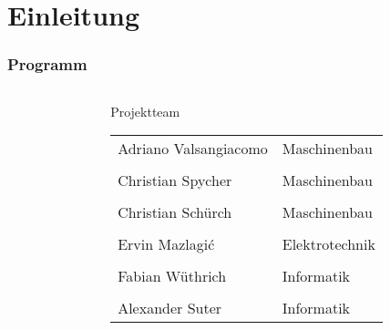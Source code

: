 \section{Einleitung}

\author{Ervin Mazlagi\'c}

\begin{frame}
	\frametitle{Programm\hfill{}\footnotesize \group}
	\begin{columns}
		\begin{column}{0.4\textwidth}
			\tableofcontents[hideallsubsections]
		\end{column}
		\begin{column}{0.6\textwidth}
			\begin{block}{Projektteam}
				\footnotesize
				\begin{tabular}{l l}
					Adriano Valsangiacomo
						& Maschinenbau \\
					& \\
					Christian Spycher
						& Maschinenbau \\
					& \\
					Christian Schürch
						& Maschinenbau \\
					& \\
					Ervin Mazlagi\'c
						& Elektrotechnik \\
					& \\
					Fabian Wüthrich
						& Informatik \\
					& \\
					Alexander Suter
						& Informatik \\
				\end{tabular}
			\end{block}
		\end{column}
	\end{columns}
\end{frame}
